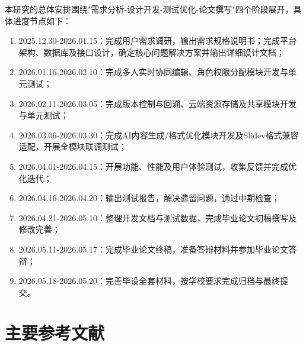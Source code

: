 本研究的总体安排围绕"需求分析-设计开发-测试优化-论文撰写"四个阶段展开，具体进度节点如下：
\begin{enumerate}[label=\arabic*.]
    \item 2025.12.30-2026.01.15：完成用户需求调研，输出需求规格说明书；完成平台架构、数据库及接口设计，确定核心问题解决方案并输出详细设计文档；
    \item 2026.01.16-2026.02.10：完成多人实时协同编辑、角色权限分配模块开发与单元测试；
    \item 2026.02.11-2026.03.05：完成版本控制与回溯、云端资源存储及共享模块开发与单元测试；
    \item 2026.03.06-2026.03.30：完成AI内容生成/格式优化模块开发及Slidev格式兼容适配，开展全模块联调测试；
    \item 2026.04.01-2026.04.15：开展功能、性能及用户体验测试，收集反馈并完成优化迭代；
    \item 2026.04.16-2026.04.20：输出测试报告，解决遗留问题，通过中期检查；
    \item 2026.04.21-2026.05.10：整理开发文档与测试数据，完成毕业论文初稿撰写及修改完善；
    \item 2026.05.11-2026.05.17：完成毕业论文终稿，准备答辩材料并参加毕业论文答辩；
    \item 2026.05.18-2026.05.20：完善毕设全套材料，按学校要求完成归档与最终提交。
\end{enumerate}

\section{主要参考文献}
